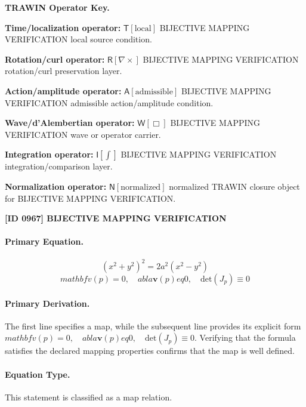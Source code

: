 \par\vspace{0.45\baselineskip}
\noindent\begin{minipage}[t]{\linewidth}
\begingroup
\small
\raggedright
\textbf{TRAWIN Operator Key.}\par
\noindent\textbf{Time/localization operator:} $\mathsf{T}\!\left[\mathrm{local}\right]$ BIJECTIVE MAPPING VERIFICATION local source condition.\par
\noindent\textbf{Rotation/curl operator:} $\mathsf{R}\!\left[\nabla\times\right]$ BIJECTIVE MAPPING VERIFICATION rotation/curl preservation layer.\par
\noindent\textbf{Action/amplitude operator:} $\mathsf{A}\!\left[\mathrm{admissible}\right]$ BIJECTIVE MAPPING VERIFICATION admissible action/amplitude condition.\par
\noindent\textbf{Wave/d'Alembertian operator:} $\mathsf{W}\!\left[\Box\right]$ BIJECTIVE MAPPING VERIFICATION wave or operator carrier.\par
\noindent\textbf{Integration operator:} $\mathsf{I}\!\left[\int\right]$ BIJECTIVE MAPPING VERIFICATION integration/comparison layer.\par
\noindent\textbf{Normalization operator:} $\mathsf{N}\!\left[\mathrm{normalized}\right]$ normalized TRAWIN closure object for BIJECTIVE MAPPING VERIFICATION.\par
\endgroup
\end{minipage}

\clearpage
\noindent\textbf{[ID 0967] BIJECTIVE MAPPING VERIFICATION}\par
\vspace{0.35em}
\paragraph{Primary Equation.}
\[
(x^2 + y^2)^2 = 2a^2(x^2 - y^2)
\]
\[
mathbf{v}(p) = 0, \quad  abla \mathbf{v}(p)  eq 0, \quad \text{det}(J_p) \equiv 0
\]

\paragraph{Primary Derivation.}
The first line specifies a map, while the subsequent line provides its explicit form \( mathbf{v}(p) = 0, \quad abla \mathbf{v}(p) eq 0, \quad \text{det}(J_p) \equiv 0 \). Verifying that the formula satisfies the declared mapping properties confirms that the map is well defined.
\paragraph{Equation Type.}
This statement is classified as a map relation.

